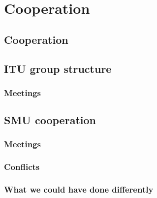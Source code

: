 \chapter{Cooperation}
\section{Cooperation}

\section{ITU group structure}
\label{Cooperation_ITU}

\subsection{Meetings}
\label{Cooperation_ITU_Meetings}

\section{SMU cooperation}
\label{Cooperation_SMU}

\subsection{Meetings}
\label{Cooperation_SMU_Meetings}

\subsection{Conflicts}
\label{Cooperation_SMU_Conflicts}

\subsection{What we could have done differently}
\label{Cooperation_SMU_CouldHave}
